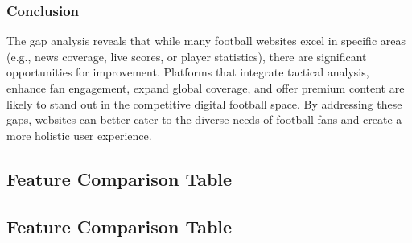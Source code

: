 \subsubsection{Conclusion}
The gap analysis reveals that while many football websites excel in specific areas (e.g., news coverage, live scores, or player statistics), there are significant opportunities for improvement. Platforms that integrate tactical analysis, enhance fan engagement, expand global coverage, and offer premium content are likely to stand out in the competitive digital football space. By addressing these gaps, websites can better cater to the diverse needs of football fans and create a more holistic user experience.

\subsection{Feature Comparison Table}

\subsection{Feature Comparison Table}

